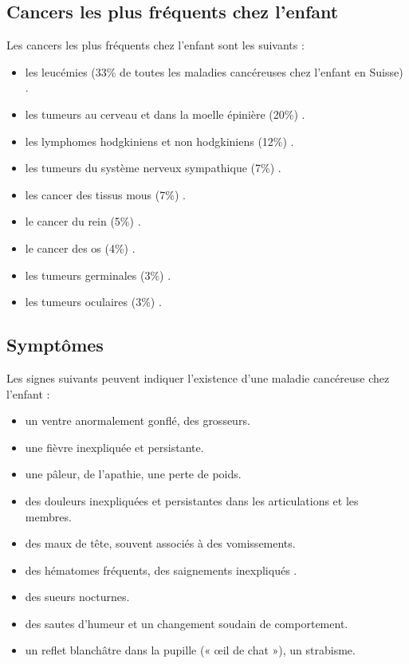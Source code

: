 \documentclass[12pt]{article}
\begin{document}
\subsection{Cancers les plus fréquents chez l’enfant}
Les cancers les plus fréquents chez l’enfant \cite{34} sont les suivants :
\begin{itemize}
	\item les leucémies (33\% de toutes les maladies cancéreuses chez l’enfant en Suisse) \cite{35}.
	\item les tumeurs au cerveau et dans la moelle épinière (20\%) .
	\item les lymphomes hodgkiniens et non hodgkiniens (12\%) .
	\item les tumeurs du système nerveux sympathique (7\%) .
	\item les cancer des tissus mous (7\%) .
	\item le cancer du rein (5\%) .
	\item le cancer des os (4\%) .
	\item les tumeurs germinales (3\%) .
	\item les tumeurs oculaires (3\%) .
\end{itemize}

\subsection{Symptômes}
Les signes suivants peuvent indiquer l’existence d’une maladie cancéreuse chez l’enfant \cite{34}:
\begin{itemize}
	\item un ventre anormalement gonflé, des grosseurs.  
	\item une fièvre inexpliquée et persistante. 
	\item une pâleur, de l’apathie, une perte de poids. 
	\item des douleurs inexpliquées et persistantes dans les articulations et les membres.
	\item des maux de tête, souvent associés à des vomissements. 
	\item des hématomes fréquents, des saignements inexpliqués . 
	\item des sueurs nocturnes. 
	\item des sautes d’humeur et un changement soudain de comportement. 
	\item un reflet blanchâtre dans la pupille (« œil de chat »), un strabisme.
\end{itemize}
\end{document}
